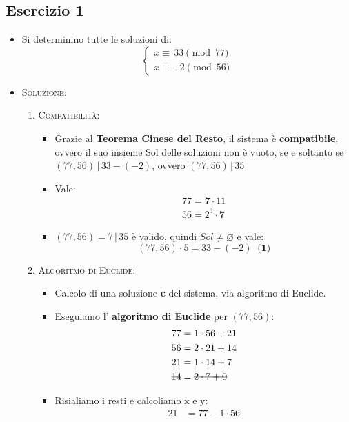 \documentclass[10pt]{article}
\begin{document}
	\subsection{Esercizio 1}
	\begin{itemize}
	\item
	Si determinino tutte le soluzioni di:
	\[		
	\begin{cases}
	x \equiv \, 33 \pmod{77} \\
	x \equiv -2 \pmod{56}
	\end{cases}
	\]
	\item
	\textsc{Soluzione:}
	\begin{enumerate}
	\item
	\textsc{Compatibilità}:
	\begin{itemize}
	\item
	Grazie al \textbf{Teorema Cinese del Resto}, il sistema è \textbf{compatibile}, ovvero il suo insieme \textsf{Sol} delle soluzioni non è vuoto, se e soltanto se $(77, 56) \,|\, 33 - (-2)$, ovvero $(77,56) \,|\, 35$
	\item
	Vale:
	\[		
	\begin{split}
	77 = \textbf{7} \cdot 11 \\
	56 = 2^3 \cdot \textbf{7}
	\end{split}
	\]
	\item
	$(77,56) = 7 \,|\, 35$ è valido, quindi $Sol \neq \varnothing $ e vale: $$(77,56) \cdot 5 = 33 - (-2) \;\; \textbf{(1)}$$
	\end{itemize}
	\item
	\textsc{Algoritmo di Euclide}:
	\begin{itemize}
	\item
	Calcolo di una soluzione \textbf{c} del sistema, via algoritmo di Euclide.
	\item
	Eseguiamo l' \textbf{algoritmo di Euclide} per $(77,56)$:
	\begin{equation}
	\begin{split}
	77 &= 1 \cdot 56 + 21 \\
	56 &= 2 \cdot 21 + 14 \\
	21 &= 1 \cdot 14 + 7 \\
	\hbox{\sout{$14$}} &= \hbox{\sout{$2 \cdot 7 + 0$}}
	\notag
	\end{split}
	\end{equation}
	\item
	Risialiamo i resti e calcoliamo x e y:
	\begin{equation}
	\begin{split}
	21 &= 77 - 1 \cdot 56 \\

\end{split}
\end{equation}
\end{itemize}
\end{enumerate}
\end{itemize}
\end{document}
